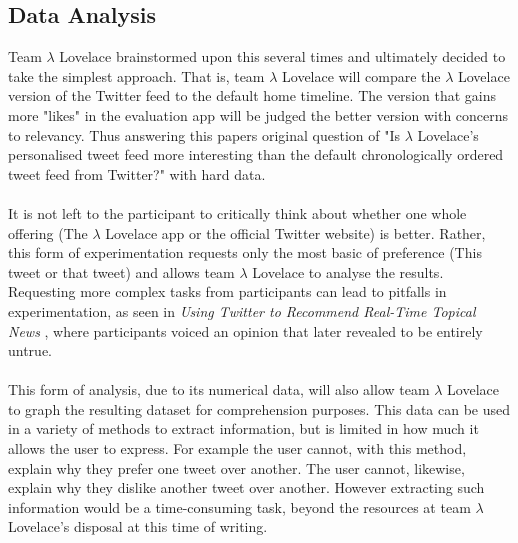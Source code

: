\documentclass{article}
\begin{document}
\subsection{Data Analysis}
%
%
Team $\lambda$ Lovelace brainstormed upon this several times and ultimately decided to take the simplest approach. That is, team $\lambda$ Lovelace will compare the $\lambda$ Lovelace version of the Twitter feed to the default home timeline. The version that gains more "likes" in the evaluation app will be judged the better version with concerns to relevancy. Thus answering this papers original question of "Is $\lambda$ Lovelace's personalised tweet feed more interesting than the default chronologically ordered tweet feed from Twitter?" with hard data.
\\\\
It is not left to the participant to critically think about whether one whole offering (The $\lambda$ Lovelace app or the official Twitter website) is better. Rather, this form of experimentation requests only the most basic of preference (This tweet or that tweet) and allows team $\lambda$ Lovelace to analyse the results. Requesting more complex tasks from participants can lead to pitfalls in experimentation, as seen in \textit{Using Twitter to Recommend Real-Time Topical News} \cite{paper3}, where participants voiced an opinion that later revealed to be entirely untrue.
\\\\
This form of analysis, due to its numerical data, will also allow team $\lambda$ Lovelace to graph the resulting dataset for comprehension purposes. This data can be used in a variety of methods to extract information, but is limited in how much it allows the user to express. For example the user cannot, with this method, explain why they prefer one tweet over another. The user cannot, likewise, explain why they dislike another tweet over another. However extracting such information would be a time-consuming task, beyond the resources at team $\lambda$ Lovelace's disposal at this time of writing.
\end{document}
